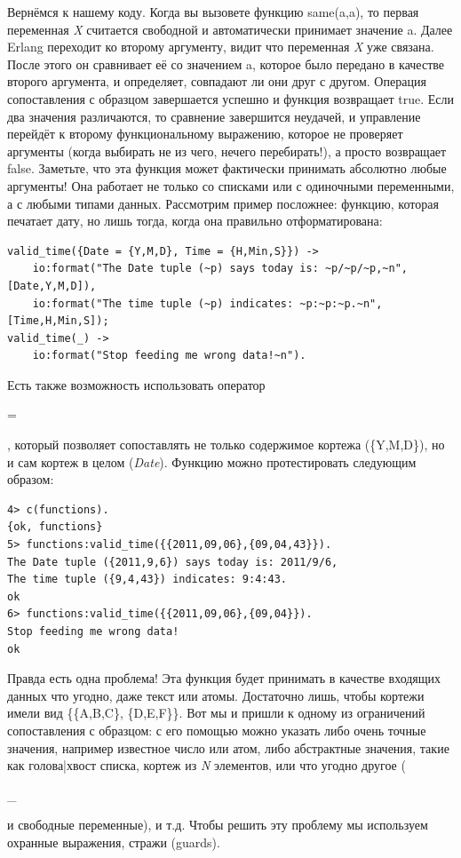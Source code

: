 \documentclass[a4paper,12pt]{report}
\newcommand{\ops}{\colorbox{lgreen}}
\begin{document}
Вернёмся к нашему коду. Когда вы вызовете функцию \ops{same(a,a)}, то первая переменная \emph{X} считается свободной и автоматически принимает значение \ops{a}. Далее Erlang переходит ко второму аргументу, видит что переменная \emph{X} уже связана. После этого он сравнивает её со значением \ops{a}, которое было передано в качестве второго аргумента, и определяет, совпадают ли они друг с другом. Операция сопоставления с образцом завершается успешно и функция возвращает \ops{true}. Если два значения различаются, то сравнение завершится неудачей, и управление перейдёт к второму функциональному выражению, которое не проверяет аргументы (когда выбирать не из чего, нечего перебирать!), а просто возвращает false. Заметьте, что эта функция может фактически принимать абсолютно любые аргументы! Она работает не только со списками или с одиночными переменными, а с любыми типами данных. Рассмотрим пример посложнее: функцию, которая печатает дату, но лишь тогда, когда она правильно отформатирована:
\begin{lstlisting}[style=erlang]
valid_time({Date = {Y,M,D}, Time = {H,Min,S}}) ->
    io:format("The Date tuple (~p) says today is: ~p/~p/~p,~n",[Date,Y,M,D]),
    io:format("The time tuple (~p) indicates: ~p:~p:~p.~n", [Time,H,Min,S]);
valid_time(_) ->
    io:format("Stop feeding me wrong data!~n").
\end{lstlisting}

Есть также возможность использовать оператор \ops{\strut=}, который позволяет сопоставлять не только содержимое кортежа (\ops{\{Y,M,D\}}), но и сам кортеж в целом (\emph{Date}). Функцию можно протестировать следующим образом:
\begin{lstlisting}[style=erlang]
4> c(functions).
{ok, functions}
5> functions:valid_time({{2011,09,06},{09,04,43}}).
The Date tuple ({2011,9,6}) says today is: 2011/9/6,
The time tuple ({9,4,43}) indicates: 9:4:43.
ok
6> functions:valid_time({{2011,09,06},{09,04}}).
Stop feeding me wrong data!
ok
\end{lstlisting}

Правда есть одна проблема! Эта функция будет принимать в качестве входящих данных что угодно, даже текст или атомы. Достаточно лишь, чтобы кортежи имели вид \ops{\{\{A,B,C\}, \{D,E,F\}\}}. Вот мы и пришли к одному из ограничений сопоставления с образцом: с его помощью можно указать либо очень точные значения, например известное число или атом, либо абстрактные значения, такие как голова|хвост списка, кортеж из \emph{N} элементов, или что угодно другое (\ops{\strut\_} и свободные переменные), и т.д. Чтобы решить эту проблему мы используем охранные выражения, стражи (guards). 
\end{document}

